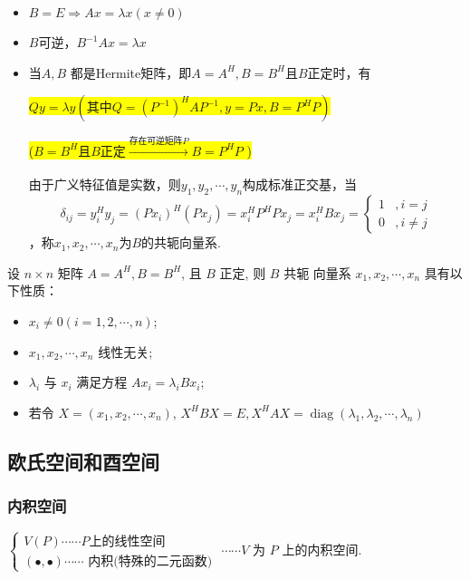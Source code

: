 \begin{note}
	\begin{itemize}
		\item $B=E\Rightarrow Ax=\lambda x(x\ne0)$
		\item $B$可逆，$B^{-1}Ax=\lambda x$
		\item 当$A,B$ 都是Hermite矩阵，即$A=A^H,B=B^H$且$B$正定时，有
		
		 \colorbox{yellow}{
			$
		Qy=\lambda y\left(\mbox{其中}Q=(P^{-1})^HAP^{-1},y=Px,B=P^HP     \right)
		$}
	
	\colorbox{yellow}{	($B=B^H$且$B$正定$\xrightarrow[]{\mbox{存在可逆矩阵}P}B=P^HP$
	)}
	
	由于广义特征值是实数，则$y_1,y_2,\cdots,y_n$构成标准正交基，当
	\[
	\delta_{ij}=y_i^Hy_j=(Px_i)^H(Px_j)=x_i^HP^HPx_j=x_i^HBx_j=\left\{
	\begin{array}{ll}
		1&,i=j\\
		0&,i\ne j
	\end{array} \right.
	\]，称$x_1,x_2,\cdots,x_n$为$B$的共轭向量系.
	\end{itemize}
\end{note}


\begin{theorem}
	设 \( n \times n \) 矩阵 \( A=A^{H}, B=B^{H} \), 且 \( B \) 正定, 则 \( B \) 共轭 向量系 \( x_{1}, x_{2}, \cdots, x_{n} \) 具有以下性质：
	
		\begin{itemize}
		\item \( x_{i} \neq 0(i=1,2, \cdots, n) \);
		\item \( x_{1}, x_{2}, \cdots, x_{n} \) 线性无关;
		\item \( \lambda_{i} \) 与 \( x_{i} \) 满足方程 \( A x_{i}=\lambda_{i} B x_{i} \);
		\item 若令 \( X=\left(x_{1}, x_{2}, \cdots, x_{n}\right) \),
		\( X^{H} B X=E, X^{H} A X=\operatorname{diag}\left(\lambda_{1}, \lambda_{2}, \cdots, \lambda_{n}\right) \)
	\end{itemize}
\end{theorem}

\subsection{欧氏空间和酉空间}
\subsubsection{内积空间}


\( \left\{\begin{array}{l}V(P)\cdots \cdots P \mbox{上的线性空间} \\ (\bullet,\bullet )\cdots \cdots \text { 内积(特殊的二元函数) }\end{array}\cdots \cdots V\right. \) 为 \( P \) 上的内积空间.

